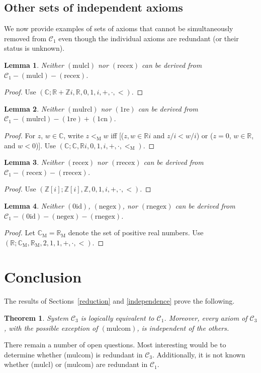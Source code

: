 \documentclass{article}
\newcommand\bC{\mathbb{C}}
\newcommand\bR{\mathbb{R}}
\newcommand\bZ{\mathbb{Z}}
\newcommand\cC{\mathcal{C}}
\newcommand\rM{\mathrm{M}}
\newtheorem{lemma}{Lemma}[section]
\newtheorem*{theorem}{Theorem}
\begin{document}
\subsection{Other sets of independent axioms}

We now provide examples of sets of axioms that cannot be simultaneously removed from $\cC_1$ even though the individual axioms are redundant (or their status is unknown).
\begin{lemma}
Neither $\mathrm{(mulcl)}$ nor $\mathrm{(recex)}$ can be derived from $\cC_1 - \mathrm{(mulcl)} - \mathrm{(recex)}$.
\end{lemma}
\begin{proof}
Use $(\bC; \bR + \bZ i, \bR, 0, 1, i, +, \cdot, <)$.
\end{proof}

\begin{lemma}
Neither $\mathrm{(mulrcl)}$ nor $\mathrm{(1re)}$ can be derived from $\cC_1 - \mathrm{(mulrcl)} - \mathrm{(1re)} + \mathrm{(1cn)}$.
\end{lemma}
\begin{proof}
For $z$, $w \in \bC$, write $z <_\rM w$ if{}f [($z,w \in \bR i$ and $z/i < w/i$) or ($z = 0$, $w \in \bR$, and $w < 0$)].  
Use $(\bC; \bC, \bR i, 0, 1, i, +, \cdot, <_\rM)$.
\end{proof}

\begin{lemma}
Neither $\mathrm{(recex)}$ nor $\mathrm{(rrecex)}$ can be derived from $\cC_1 - \mathrm{(recex)} - \mathrm{(rrecex)}$.
\end{lemma}
\begin{proof}
Use $(\bZ[i]; \bZ[i], \bZ, 0, 1, i, +, \cdot, <)$.
\end{proof}

\begin{lemma}
Neither $\mathrm{(0id)}$, $\mathrm{(negex)}$, nor $\mathrm{(rnegex)}$ can be derived from $\cC_1 - \mathrm{(0id)} - \mathrm{(negex)} - \mathrm{(rnegex)}$.
\end{lemma}
\begin{proof}
Let $\bC_\rM = \bR_\rM$ denote the set of positive real numbers.
Use $(\bR; \bC_\rM, \bR_\rM, 2, 1, 1, +, \cdot, <)$.
\end{proof}

\section{Conclusion}

The results of Sections~\ref{reduction} and \ref{independence} prove the following.

\begin{theorem}
System $\cC_3$ is logically equivalent to $\cC_1$. Moreover, every axiom of $\cC_3$, with the possible exception of $\mathrm{(mulcom)}$, is independent of the others.
\end{theorem}

There remain a number of open questions. Most interesting would be to determine whether (mulcom) is redundant in $\cC_3$. Additionally, it is not known whether (mulcl) or (mulcom) are redundant in $\cC_1$.
\end{document}
